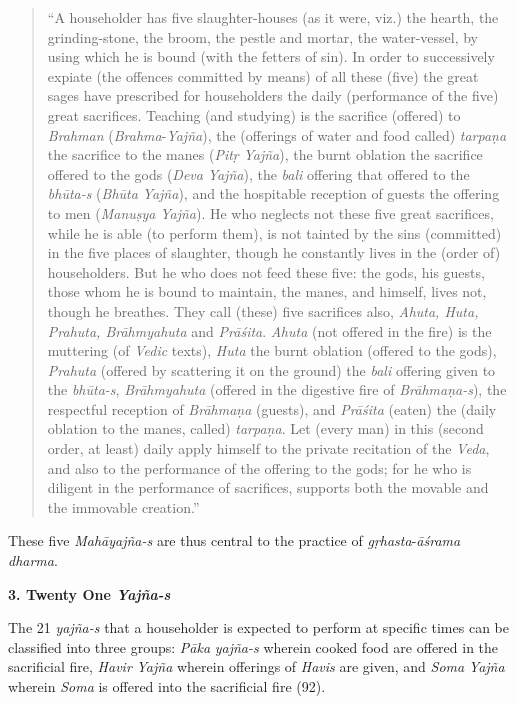 \begin{quote}
``A householder has five slaughter-houses (as it were, viz.) the hearth, the grinding-stone, the broom, the pestle and mortar, the water-vessel, by using which he is bound (with the fetters of sin). In order to successively expiate (the offences committed by means) of all these (five) the great sages have prescribed for householders the daily (performance of the five) great sacrifices. Teaching (and studying) is the sacrifice (offered) to \emph{Brahman} (\emph{Brahma}-\emph{Yajña}), the (offerings of water and food called) \emph{tarpaṇa} the sacrifice to the manes (\emph{Pitṛ} \emph{Yajña}), the burnt oblation the sacrifice offered to the gods (\emph{Deva} \emph{Yajña}), the \emph{bali} offering that offered to the \emph{bhūta-s} (\emph{Bhūta} \emph{Yajña}), and the hospitable reception of guests the offering to men (\emph{Manuṣya} \emph{Yajña}). He who neglects not these five great sacrifices, while he is able (to perform them), is not tainted by the sins (committed) in the five places of slaughter, though he constantly lives in the (order of) householders. But he who does not feed these five: the gods, his guests, those whom he is bound to maintain, the manes, and himself, lives not, though he breathes. They call (these) five sacrifices also, \emph{Ahuta, Huta, Prahuta, Brāhmyahuta} and \emph{Prāśita}. \emph{Ahuta} (not offered in the fire) is the muttering (of \emph{Vedic} texts), \emph{Huta} the burnt oblation (offered to the gods), \emph{Prahuta} (offered by scattering it on the ground) the \emph{bali} offering given to the \emph{bhūta-s}, \emph{Brāhmyahuta} (offered in the digestive fire of \emph{Brāhmaṇa-s}), the respectful reception of \emph{Brāhmaṇa} (guests), and \emph{Prāśita} (eaten) the (daily oblation to the manes, called) \emph{tarpaṇa}. Let (every man) in this (second order, at least) daily apply himself to the private recitation of the \emph{Veda}, and also to the performance of the offering to the gods; for he who is diligent in the performance of sacrifices, supports both the movable and the immovable creation.''
\end{quote}

These five \emph{Mahāyajña-s} are thus central to the practice of \emph{gṛhasta}-\emph{āśrama} \emph{dharma}.

\textbf{3. Twenty One \emph{Yajña-s}}

The 21 \emph{yajña-s} that a householder is expected to perform at specific times can be classified into three groups: \emph{Pāka} \emph{yajña-s} wherein cooked food are offered in the sacrificial fire, \emph{Havir} \emph{Yajña} wherein offerings of \emph{Havis} are given, and \emph{Soma} \emph{Yajña} wherein \emph{Soma} is offered into the sacrificial fire (92).


